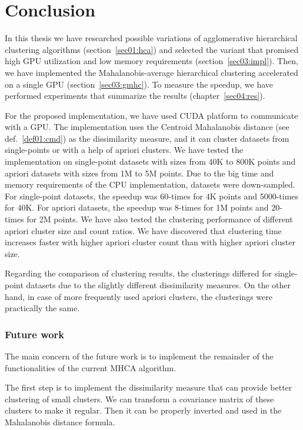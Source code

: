 \chapter*{Conclusion}

In this thesis we have researched possible variations of agglomerative hierarchical clustering algorithms (section~\ref{sec01:hca}) and selected the variant that promised high GPU utilization and low memory requirements (section~\ref{sec03:impl}). Then, we have implemented the Mahalanobis-average hierarchical clustering accelerated on a single GPU (section~\ref{sec03:gmhc}). To measure the speedup, we have performed experiments that summarize the results (chapter~\ref{sec04:res}). 

For the proposed implementation, we have used CUDA platform to communicate with a GPU. The implementation uses the Centroid Mahalanobis distance (see def.~\ref{def01:cmd}) as the dissimilarity measure, and it can cluster datasets from single-points or with a help of apriori clusters. We have tested the implementation on single-point datasets with sizes from 40K to 800K points and apriori datasets with sizes from 1M to 5M points. Due to the big time and memory requirements of the CPU implementation, datasets were down-sampled. For single-point datasets, the speedup was 60-times for 4K points and 5000-times for 40K. For apriori datasets, the speedup was 8-times for 1M points and 20-times for 2M points. We have also tested the clustering performance of different apriori cluster size and count ratios. We have discovered that clustering time increases faster with higher apriori cluster count than with higher apriori cluster size.

Regarding the comparison of clustering results, the clusterings differed for sin\-gle-point datasets due to the slightly different dissimilarity measures. On the other hand, in case of more frequently used apriori clusters, the clusterings were practically the same.

\subsection*{Future work}

The main concern of the future work is to implement the remainder of the functionalities of the current MHCA algorithm.

The first step is to implement the dissimilarity measure that can provide better clustering of small clusters. We can transform a covariance matrix of  these clusters to make it regular. Then it can be properly inverted and used in the Mahalanobis distance formula.

